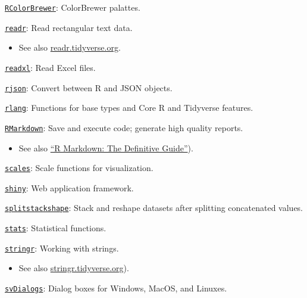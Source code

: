 \documentclass[]{book}
\providecommand{\tightlist}{%
  \setlength{\itemsep}{0pt}\setlength{\parskip}{0pt}}
\begin{document}
\href{https://CRAN.R-project.org/package=RColorBrewer}{\texttt{RColorBrewer}}: ColorBrewer palattes.

\href{https://CRAN.R-project.org/package=readr}{\texttt{readr}}: Read rectangular text data.

\begin{itemize}
\tightlist
\item
  See also \href{https://readr.tidyverse.org/}{readr.tidyverse.org}.
\end{itemize}

\href{https://CRAN.R-project.org/package=readxl}{\texttt{readxl}}: Read Excel files.

\href{https://CRAN.R-project.org/package=rjson}{\texttt{rjson}}: Convert between R and JSON objects.

\href{https://CRAN.R-project.org/package=rlang}{\texttt{rlang}}: Functions for base types and Core R and Tidyverse features.

\href{https://CRAN.R-project.org/package=rmarkdown}{\texttt{RMarkdown}}: Save and execute code; generate high quality reports.

\begin{itemize}
\tightlist
\item
  See also \href{https://bookdown.org/yihui/rmarkdown/}{``R Markdown: The Definitive Guide''}).
\end{itemize}

\href{https://CRAN.R-project.org/package=scales}{\texttt{scales}}: Scale functions for visualization.

\href{https://CRAN.R-project.org/package=shiny}{\texttt{shiny}}: Web application framework.

\href{https://CRAN.R-project.org/package=splitstackshape}{\texttt{splitstackshape}}: Stack and reshape datasets after splitting concatenated values.

\href{https://www.rdocumentation.org/packages/stats/versions/3.5.1}{\texttt{stats}}: Statistical functions.

\href{https://CRAN.R-project.org/package=stringr}{\texttt{stringr}}: Working with strings.

\begin{itemize}
\tightlist
\item
  See also \href{https://stringr.tidyverse.org/}{stringr.tidyverse.org}).
\end{itemize}

\href{https://CRAN.R-project.org/package=svDialogs}{\texttt{svDialogs}}: Dialog boxes for Windows, MacOS, and Linuxes.
\end{document}
